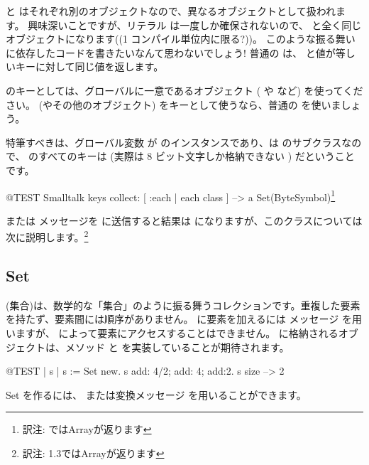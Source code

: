 \documentclass[a4paper,10pt,twoside]{book}
\begin{document}
\noindent
{} と  はそれぞれ別のオブジェクトなので、異なるオブジェクトとして扱われます。
興味深いことですが、リテラル \mbox{} は一度しか確保されないので、 と全く同じオブジェクトになります((1 コンパイル単位内に限る?))。
このような振る舞いに依存したコードを書きたいなんて思わないでしょう!
普通の  は、 と値が等しいキーに対して同じ値を返します。

 のキーとしては、グローバルに一意であるオブジェクト ( や  など) を使ってください。 (やその他のオブジェクト) をキーとして使うなら、普通の  を使いましょう。


特筆すべきは、グローバル変数  が  のインスタンスであり、は  のサブクラスなので、 のすべてのキーは  (実際は 8 ビット文字しか格納できない ) だということです。

\begin{code}{@TEST}
Smalltalk keys collect: [ :each | each class ] --> a Set(ByteSymbol)\footnote{訳注:  ではArrayが返ります}
\end{code}
\noindent
{} または  メッセージを  に送信すると結果は  になりますが、このクラスについては次に説明します。\footnote{訳注: \pharo 1.3ではArrayが返ります}

\subsection{Set}
 (集合)は、数学的な「集合」のように振る舞うコレクションです。\ie 重複した要素を持たず、要素間には順序がありません。 に要素を加えるには メッセージ を用いますが、 によって要素にアクセスすることはできません。 に格納されるオブジェクトは、メソッド  と \ct{=} を実装していることが期待されます。

\begin{code}{@TEST | s | }
s := Set new.
s add: 4/2; add: 4; add:2.
s size --> 2
\end{code}

Set を作るには、 または変換メッセージ  を用いることができます。
\end{document}
